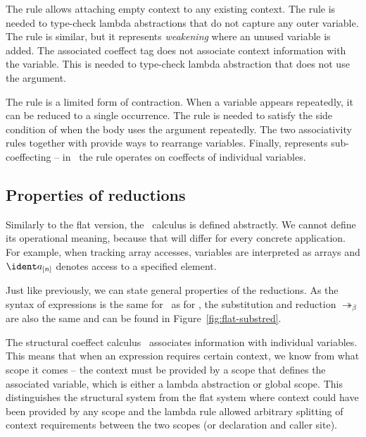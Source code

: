 The  rule allows attaching empty context to any existing context. The rule 
is needed to type-check lambda abstractions that do not capture any outer variable.
The  rule is similar, but it represents \emph{weakening} where an unused variable is 
added. The associated coeffect tag does not associate context information with the variable.
This is needed to type-check lambda abstraction that does not use the argument.

The  rule is a limited form of contraction. When a variable appears repeatedly,
it can be reduced to a single occurrence. The rule is needed to satisfy the side condition
of  when the body uses the argument repeatedly. The two associativity rules
together with  provide ways to rearrange variables. Finally,  represents
sub-coeffecting -- in \clstr~the rule operates on coeffects of individual variables.




\subsection{Properties of reductions}
\label{sec:structural-metatheory}
Similarly to the flat version, the \clstr~calculus is defined abstractly. We cannot define its
operational meaning, because that will differ for every concrete application. For example,
when tracking array accesses, variables are interpreted as arrays and $\pastval{a}{n}$ denotes
access to a specified element. 

Just like previously, we can state general properties of the reductions. As the syntax of expressions
is the same for \clstr~as for \clflt, the substitution and reduction $\twoheadrightarrow_\beta$ 
are also the same and can be found in Figure~\ref{fig:flat-substred}.

The structural coeffect calculus \clstr~associates information with individual variables. This means
that when an expression requires certain context, we know from what scope it comes -- the
context must be provided by a scope that defines the associated variable, which is either a
lambda abstraction or global scope. This distinguishes the structural system from the flat system
where context could have been provided by any scope and the lambda rule allowed arbitrary 
splitting of context requirements between the two scopes (or declaration and caller site).

